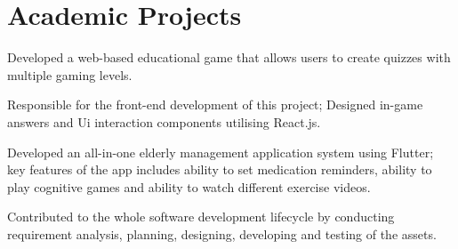 \documentclass[]{deedy-resume}
\begin{document}
\begin{minipage}[t]{0.66\textwidth}
\begin{tightemize}
\end{tightemize}
\sectionsep


\section{Academic Projects}
\begin{tightemize}
\item Developed a web-based educational game that allows users to create quizzes with multiple gaming levels.
\item Responsible for the front-end development of this project; Designed in-game answers and Ui interaction components utilising React.js. 
\end{tightemize}
\sectionsep

\descript{|  }
\begin{tightemize}
\item Developed an all-in-one elderly management application system using Flutter; key features of the app includes ability to set medication reminders, ability to play cognitive games and ability to watch different exercise videos.
\item Contributed to the whole software development lifecycle by conducting requirement analysis, planning, designing, developing and testing of the assets.
\end{tightemize}
\sectionsep




\end{minipage}
\end{document}
